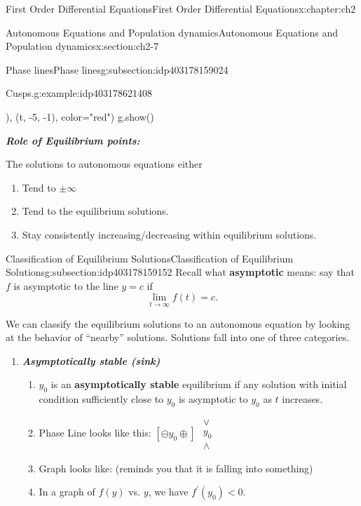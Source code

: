 \documentclass[oneside,10pt,]{book}
\newcommand{\alert}[1]{\textbf{\textit{#1}}}
\newcommand{\terminology}[1]{\textbf{#1}}
\numberwithin{equation}{section}
\numberwithin{equation}{section}
\newcommand{\lt}{<}
\begin{document}
\begin{chapterptx}{First Order Differential Equations}{}{First Order Differential Equations}{}{}{x:chapter:ch2}
\begin{sectionptx}{Autonomous Equations and Population dynamics}{}{Autonomous Equations and Population dynamics}{}{}{x:section:ch2-7}
\begin{subsectionptx}{Phase lines}{}{Phase lines}{}{}{g:subsection:idp403178159024}
\begin{example}{Cusps.}{g:example:idp403178621408}
\begin{sageinput}
), (t, -5, -1), color="red")
g.show()
\end{sageinput}
\end{example}
\alert{Role of Equilibrium points:}%
\par
The solutions to autonomous equations either%
\begin{enumerate}
\item{}Tend to \(\pm\infty\)%
\item{}Tend to the equilibrium solutions.%
\item{}Stay consistently increasing\slash{}decreasing within equilibrium solutions.%
\end{enumerate}
%
\end{subsectionptx}
%
%
\typeout{************************************************}
\typeout{************************************************}
%
\begin{subsectionptx}{Classification of Equilibrium Solutions}{}{Classification of Equilibrium Solutions}{}{}{g:subsection:idp403178159152}
Recall what \terminology{asymptotic} means: say that \(f\) is asymptotic to the line \(y = c\) if%
\begin{equation*}
\lim_{t \to \infty} f(t) = c.
\end{equation*}
%
\par
We can classify the equilibrium solutions to an autonomous equation by looking at the behavior of ``nearby'' solutions. Solutions fall into one of three categories.%
%
\begin{enumerate}
\item{}\alert{Asymptotically stable (sink)}%
%
\begin{enumerate}
\item{}\(y_{0}\) is an \terminology{asymptotically stable} equilibrium if any solution with initial condition sufficiently close to \(y_{0}\) is asymptotic to \(y_{0}\) as \(t\) increases.%
\item{}Phase Line looks like this: \(\left[\ominus y_{0}\oplus\right]\) \(\begin{array}{c}
\vee\\
y_{0}\\
\wedge
\end{array}\)%
\item{}Graph looks like: (reminds you that it is falling into something)%
\item{}In a graph of \(f(y)\) vs. \(y\), we have \(f^{\prime}(y_{0}) \lt 0\).%
\end{enumerate}

\end{enumerate}
\end{subsectionptx}
\end{sectionptx}
\end{chapterptx}
\end{document}
